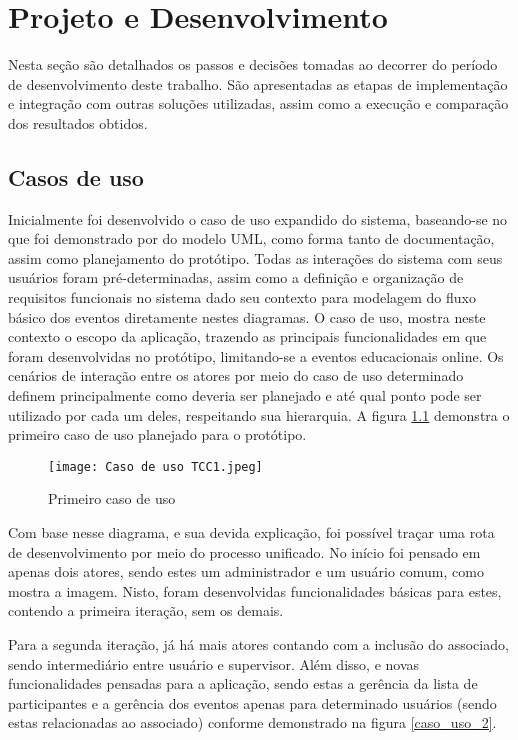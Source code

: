 \chapter{Projeto e Desenvolvimento}\label{chp:LABEL_CHP_4}
Nesta seção são detalhados os passos e decisões tomadas ao decorrer do período de desenvolvimento deste trabalho. São apresentadas as etapas de implementação e integração com outras soluções utilizadas, assim como a execução e comparação dos resultados obtidos.

\section{Casos de uso}
Inicialmente foi desenvolvido o caso de uso expandido do sistema, baseando-se no que foi demonstrado por  do modelo UML, como forma tanto de documentação, assim como planejamento do protótipo. Todas as interações do sistema com seus usuários foram pré-determinadas, assim como a definição e organização de requisitos funcionais no sistema dado seu contexto para modelagem do fluxo básico dos eventos diretamente nestes diagramas. O caso de uso, mostra neste contexto o escopo da aplicação, trazendo as principais funcionalidades em que foram desenvolvidas no protótipo, limitando-se a eventos educacionais online. Os cenários de interação entre os atores por meio do caso de uso determinado definem principalmente como deveria ser planejado e até qual ponto pode ser utilizado por cada um deles, respeitando sua hierarquia. A figura \ref{caso_uso_1} demonstra o primeiro caso de uso planejado para o protótipo.

\begin{figure}[H]
    \caption{\label{caso_uso_1}Primeiro caso de uso}
    \vspace{5pt}
    \centering
    \texttt{[image: Caso de uso TCC1.jpeg]}
    \vspace{5pt}
\end{figure}


Com base nesse diagrama, e sua devida explicação, foi possível traçar uma rota de desenvolvimento por meio do processo unificado. No início foi pensado em apenas dois atores, sendo estes um administrador e um usuário comum, como mostra a imagem. Nisto, foram desenvolvidas funcionalidades básicas para estes, contendo a primeira iteração, sem os demais. 

Para a segunda iteração, já há mais atores contando com a inclusão do associado, sendo intermediário entre usuário e supervisor. Além disso, e novas funcionalidades pensadas para a aplicação, sendo estas a gerência da lista de participantes e a gerência dos eventos apenas para determinado usuários (sendo estas relacionadas ao associado) conforme demonstrado na figura \ref{caso_uso_2}.

